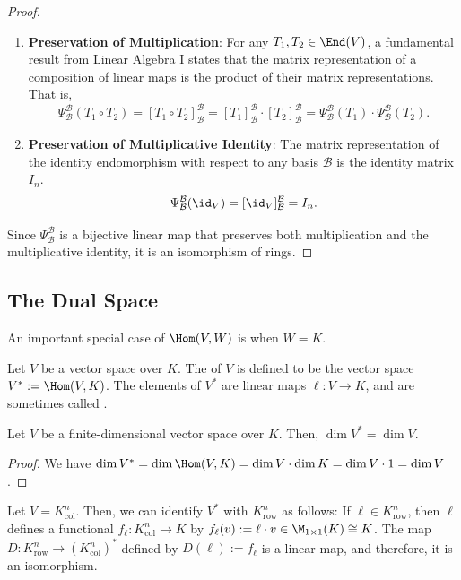 \begin{proof}
  \begin{enumerate}
    \item \textbf{Preservation of Multiplication}: For any $T_1, T_2 \in \End(V)$, a fundamental result from Linear Algebra I states that the matrix representation of a composition of linear maps is the product of their matrix representations. That is,
    \[ \Psi_{\mathcal{B}}^{\mathcal{B}}(T_1 \circ T_2) = [T_1 \circ T_2]_{\mathcal{B}}^{\mathcal{B}} = [T_1]_{\mathcal{B}}^{\mathcal{B}} \cdot [T_2]_{\mathcal{B}}^{\mathcal{B}} = \Psi_{\mathcal{B}}^{\mathcal{B}}(T_1) \cdot \Psi_{\mathcal{B}}^{\mathcal{B}}(T_2). \]
    \item \textbf{Preservation of Multiplicative Identity}: The matrix representation of the identity endomorphism with respect to any basis $\mathcal{B}$ is the identity matrix $I_n$.
    \[ \Psi_{\mathcal{B}}^{\mathcal{B}}(\id_V) = [\id_V]_{\mathcal{B}}^{\mathcal{B}} = I_n. \]
  \end{enumerate}
  Since $\Psi_{\mathcal{B}}^{\mathcal{B}}$ is a bijective linear map that preserves both multiplication and the multiplicative identity, it is an isomorphism of rings.
\end{proof}


\subsection{The Dual Space}
An important special case of $\Hom(V,W)$ is when $W=K$.

\begin{definition}
  Let $V$ be a vector space over $K$. The  of $V$ is defined to be the vector space $V^* := \Hom(V,K)$. The elements of $V^*$ are linear maps $\ell \colon V \to K$, and are sometimes called .
\end{definition}

\begin{corollary}
  Let $V$ be a finite-di\-men\-sional vector space over $K$. Then, $\dim V^* = \dim V$.
\end{corollary}

\begin{proof}
  We have $\dim V^* = \dim \Hom(V,K) = \dim V \cdot \dim K = \dim V \cdot 1 = \dim V$.
\end{proof}

Let $V = K_{\text{col}}^n$. Then, we can identify $V^*$ with $K_{\text{row}}^n$ as follows: If $\ell \in K_{\text{row}}^n$, then $\ell$ defines a functional $f_{\ell} \colon K_{\text{col}}^n \to K$ by $f_{\ell}(v) := \ell \cdot v \in \M_{1 \times 1}(K) \cong K$. The map $D \colon K_{\text{row}}^n \to (K_{\text{col}}^n)^*$ defined by $D(\ell) := f_{\ell}$ is a linear map, and therefore, it is an isomorphism.

